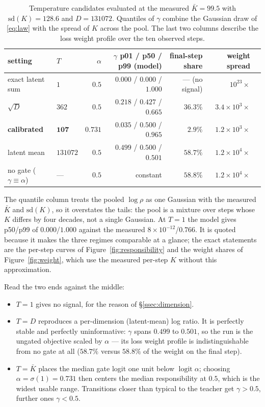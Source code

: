 \documentclass[11pt,a4paper]{article}
\begin{document}
\begin{table}[htbp]
\centering
\caption{Temperature candidates evaluated at the measured $\bar{K}=99.5$ with
$\mathrm{sd}(K)=128.6$ and $D=131072$. Quantiles of $\gamma$ combine the Gaussian draw of
\eqref{eq:law} with the spread of $K$ across the pool. The last two columns describe the loss
weight profile over the ten observed steps.}
\label{tab:temperature}
\begin{tabular}{@{}llrrrrr@{}}
\toprule
setting & $T$ & $\alpha$ & $\gamma$ p01 / p50 / p99 (model) & final-step share & weight spread\\
\midrule
exact latent sum & $1$ & $0.5$ & $0.000$ / $0.000$ / $1.000$ & --- (no signal) & $10^{23}\times$\\
$\sqrt{D}$ & $362$ & $0.5$ & $0.218$ / $0.427$ / $0.665$ & $36.3\%$ & $3.4\times10^{3}\times$\\
\textbf{calibrated} & $\bm{107}$ & $\bm{0.731}$ & $0.035$ / $0.500$ / $0.965$ & $2.9\%$
  & $1.2\times10^{3}\times$\\
latent mean & $131072$ & $0.5$ & $0.499$ / $0.500$ / $0.501$ & $58.7\%$ & $1.2\times10^{4}\times$\\
\midrule
no gate ($\gamma\equiv\alpha$) & --- & $0.5$ & constant & $58.8\%$ & $1.2\times10^{4}\times$\\
\bottomrule
\end{tabular}
\end{table}

The quantile column treats the pooled $\log\rho$ as one Gaussian with the measured $\bar{K}$ and
$\mathrm{sd}(K)$, so it overstates the tails: the pool is a mixture over steps whose $K$ differs by
four decades, not a single Gaussian. At $T=1$ the model gives p50/p99 of $0.000$/$1.000$ against
the measured $8\times10^{-12}$/$0.766$. It is quoted because it makes the three regimes comparable
at a glance; the exact statements are the per-step curves of Figure~\ref{fig:responsibility} and
the weight shares of Figure~\ref{fig:weight}, which use the measured per-step $K$ without this
approximation.

Read the two ends against the middle:
\begin{itemize}[leftmargin=1.4em,itemsep=0.25em]
\item $T=1$ gives no signal, for the reason of \S\ref{ssec:dimension}.
\item $T=D$ reproduces a per-dimension (latent-mean) log ratio. It is perfectly stable and
      perfectly uninformative: $\gamma$ spans $0.499$ to $0.501$, so the run is the ungated
      objective scaled by $\alpha$ --- its loss weight profile is indistinguishable from no gate
      at all ($58.7\%$ versus $58.8\%$ of the weight on the final step).
\item $T=\bar{K}$ places the median gate logit one unit below $\operatorname{logit}\alpha$;
      choosing $\alpha=\sigma(1)=0.731$ then centers the median responsibility at $0.5$, which is
      the widest usable range. Transitions closer than typical to the teacher get
      $\gamma>0.5$, further ones $\gamma<0.5$.
\end{itemize}
\end{document}
